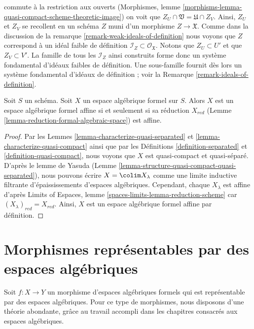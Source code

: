 \begin{remark}
commute à la restriction aux ouverts (Morphismes, lemme
\ref{morphisms-lemma-quasi-compact-scheme-theoretic-image})
on voit que $Z_U \cap \mathfrak V = \mathfrak U \cap Z_V$.
Ainsi, $Z_U$ et $Z_V$ se recollent en un schéma $Z$ muni
d'un morphisme $Z \to \mathfrak X$. Comme dans la discussion de la
remarque \ref{remark-weak-ideals-of-definition}
nous voyons que $Z$ correspond à un idéal faible
de définition $\mathcal{I}_Z \subset \mathcal{O}_\mathfrak X$.
Notons que $Z_U \subset U'$ et que
$Z_V \subset V'$. La famille de tous les $\mathcal{I}_Z$
ainsi construits forme donc un système fondamental d'idéaux faibles
de définition. Une sous-famille fournit dès lors un système fondamental d'idéaux
de définition ; voir la Remarque \ref{remark-ideals-of-definition}.
\end{remark}

\begin{lemma}
\label{lemma-characterize-affine}
Soit $S$ un schéma. Soit $X$ un espace algébrique formel sur $S$.
Alors $X$ est un espace algébrique formel affine si et seulement si
sa réduction $X_{red}$ (Lemme \ref{lemma-reduction-formal-algebraic-space})
est affine.
\end{lemma}

\begin{proof}
Par les Lemmes \ref{lemma-characterize-quasi-separated} et
\ref{lemma-characterize-quasi-compact} ainsi que par les
Définitions \ref{definition-separated} et \ref{definition-quasi-compact},
nous voyons que $X$ est quasi-compact et quasi-séparé.
D'après le lemme de Yasuda (Lemme \ref{lemma-structure-quasi-compact-quasi-separated}),
nous pouvons écrire $X = \colim X_\lambda$ comme une limite inductive filtrante
d'épaississements d'espaces algébriques. Cependant, chaque $X_\lambda$
est affine d'après Limits of Espaces, lemme
\ref{spaces-limits-lemma-reduction-scheme}
car $(X_\lambda)_{red} = X_{red}$.
Ainsi, $X$ est un espace algébrique formel affine par définition.
\end{proof}






\section{Morphismes représentables par des espaces algébriques}
\label{section-representable}

\noindent
Soit $f : X \to Y$ un morphisme d'espaces algébriques formels qui
est représentable par des espaces algébriques. Pour ce type de morphismes,
nous disposons d'une théorie abondante, grâce au travail accompli
dans les chapitres consacrés aux espaces algébriques.

